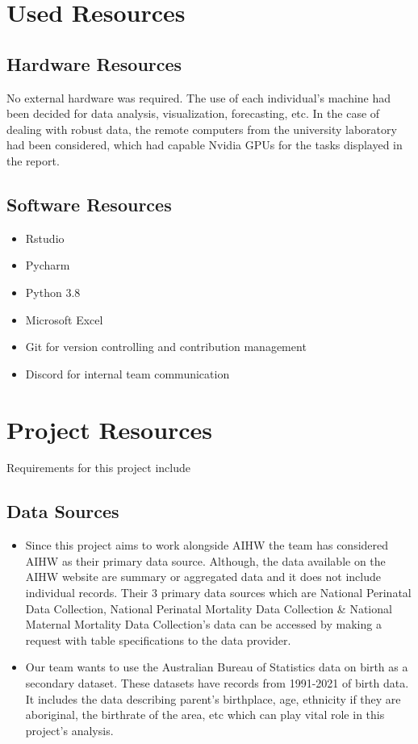 \section{Used Resources}
\subsection{Hardware Resources}
 No external hardware was required. The use of each individual's machine had been decided for data analysis, visualization, forecasting, etc. In the case of dealing with robust data, the remote computers from the university laboratory had been considered, which had capable Nvidia GPUs for the tasks displayed in the report.
\subsection{Software Resources}
\begin{itemize}
    \item Rstudio
    \item Pycharm
    \item Python 3.8
    \item Microsoft Excel
    \item Git for version controlling and contribution management
    \item Discord for internal team communication
\end{itemize}

\section{Project Resources}
Requirements for this project include
\subsection{Data Sources}
\begin{itemize}
    \item Since this project aims to work alongside AIHW the team has considered AIHW as their primary data source. Although, the data available on the AIHW website are summary or aggregated data and it does not include individual records. Their 3 primary data sources which are National Perinatal Data Collection, National Perinatal Mortality Data Collection \& National Maternal Mortality Data Collection’s data can be accessed by making a request with table specifications to the data provider.
    \item Our team wants to use the Australian Bureau of Statistics data on birth as a secondary dataset. These datasets have records from 1991-2021 of birth data. It includes the data describing parent’s birthplace, age, ethnicity if they are aboriginal, the birthrate of the area, etc which can play vital role in this project’s analysis.
\end{itemize}
